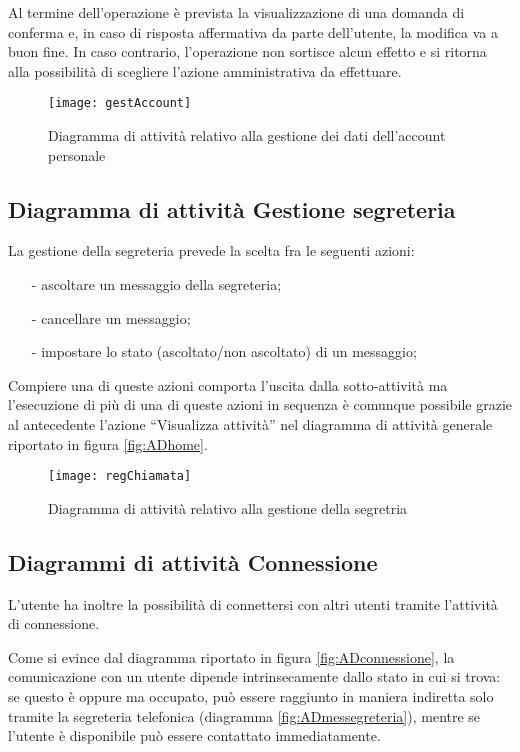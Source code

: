 Al termine dell'operazione è prevista la visualizzazione di una domanda di conferma e, in caso di risposta affermativa da parte dell'utente, la modifica va a buon fine. In caso contrario, l'operazione non sortisce alcun effetto e si ritorna alla possibilità di scegliere l'azione amministrativa da effettuare.

\begin{figure}[H]
  \centering
  \texttt{[image: gestAccount]}
  \caption{Diagramma di attività relativo alla gestione dei dati dell'account personale}\label{fig:ADgestioneaccount}
\end{figure}

\subsection{Diagramma di attività Gestione segreteria}
La gestione della segreteria prevede la scelta fra le seguenti azioni:
\begin{itemize}[noitemsep,nolistsep]
 \item[-] ascoltare un messaggio della segreteria;
 \item[-] cancellare un messaggio;
 \item[-] impostare lo stato (ascoltato/non ascoltato) di un messaggio;
\end{itemize}

Compiere una di queste azioni comporta l'uscita dalla sotto-attività ma l'esecuzione di più di una di queste azioni in sequenza è comunque possibile grazie al  antecedente l'azione ``Visualizza attività'' nel diagramma di attività generale riportato in figura \vref{fig:ADhome}.

\begin{figure}[H]
  \centering
 \texttt{[image: regChiamata]}
  \caption{Diagramma di attività relativo alla gestione della segretria}\label{fig:ADgestionesegreteria}
\end{figure}

\subsection{Diagrammi di attività Connessione}
L'utente ha inoltre la possibilità di connettersi con altri utenti tramite l'attività di connessione.

Come si evince dal diagramma riportato in figura \vref{fig:ADconnessione}, la comunicazione con un utente dipende intrinsecamente dallo stato in cui si trova: se questo è  oppure  ma occupato, può essere raggiunto in maniera indiretta solo tramite la segreteria telefonica (diagramma \ref{fig:ADmessegreteria}), mentre se l'utente è disponibile può essere contattato immediatamente.


